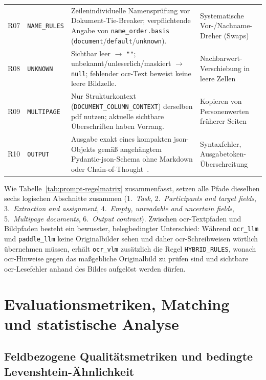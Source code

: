 \begin{table}[htbp]
\begin{tabularx}{\textwidth}{@{}>{\raggedright\arraybackslash}p{} >{\raggedright\arraybackslash}p{} >{\raggedright\arraybackslash}X >{\raggedright\arraybackslash}p{}@{}}
    R07 & \texttt{NAME\_RULES} & Zeilenindividuelle Namensprüfung vor Dokument-Tie-Breaker; verpflichtende Angabe von \texttt{name\_order.basis} (\texttt{document}/\texttt{default}/\texttt{unknown}). & Systematische Vor-/Nachname-Dreher (Swaps) \\
    \addlinespace[2pt]
    R08 & \texttt{UNKNOWN} & Sichtbar leer $\rightarrow$ \texttt{""}; unbekannt/unleserlich/maskiert $\rightarrow$ \texttt{null}; fehlender \ac{ocr}-Text beweist keine leere Bildzelle. & Nachbarwert-Verschiebung in leere Zellen \\
    \addlinespace[2pt]
    R09 & \texttt{MULTIPAGE} & Nur Strukturkontext (\texttt{DOCUMENT\_COLUMN\_CONTEXT}) derselben \ac{pdf} nutzen; aktuelle sichtbare Überschriften haben Vorrang. & Kopieren von Personenwerten früherer Seiten \\
    \addlinespace[2pt]
    R10 & \texttt{OUTPUT} & Ausgabe exakt eines kompakten \ac{json}-Objekts gemäß angehängtem Pydantic-\ac{json}-Schema ohne Markdown oder Chain-of-Thought~\cite{Schulhoff2025PromptReport,Geng2023Grammar}. & Syntaxfehler, Ausgabetoken-Überschreitung \\
    \bottomrule
  \end{tabularx}
\end{table}

Wie Tabelle~\ref{tab:prompt-regelmatrix} zusammenfasst, setzen alle Pfade dieselben sechs logischen Abschnitte zusammen (1.~\emph{Task}, 2.~\emph{Participants and target fields}, 3.~\emph{Extraction and assignment}, 4.~\emph{Empty, unreadable and uncertain fields}, 5.~\emph{Multipage documents}, 6.~\emph{Output contract}). Zwischen \ac{ocr}-Textpfaden und Bildpfaden besteht ein bewusster, belegbedingter Unterschied: Während \texttt{ocr\_llm} und \texttt{paddle\_llm} keine Originalbilder sehen und daher \ac{ocr}-Schreibweisen wörtlich übernehmen müssen, erhält \texttt{ocr\_vlm} zusätzlich die Regel \texttt{HYBRID\_RULES}, wonach \ac{ocr}-Hinweise gegen das maßgebliche Originalbild zu prüfen sind und sichtbare \ac{ocr}-Lesefehler anhand des Bildes aufgelöst werden dürfen.

\section{Evaluationsmetriken, Matching und statistische Analyse}
\label{sec:methodik-metriken}

\subsection{Feldbezogene Qualitätsmetriken und bedingte Levenshtein-Ähnlichkeit}
\label{subsec:feldmetriken}

